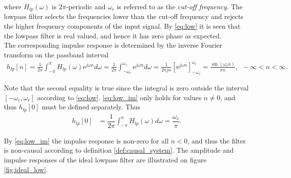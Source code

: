 where $H_{lp}(\omega)$ is $2\pi$-periodic and $\omega_c$ is referred to as the \textit{cut-off frequency}. The lowpass filter selects the frequencies lower than the cut-off frequency and rejects the higher frequency components of the input signal. By \eqref{eq:low} it is seen that the lowpass filter is real valued, and hence it has zero phase as expected. \\
The corresponding impulse response is determined by the inverse Fourier transform on the passband interval
\begin{align} \label{eq:low_im}
h_{lp}[n] = \frac{1}{2\pi} \int_{-\pi}^{\pi} H_{lp}(\omega) \text{e}^{j\omega n} d\omega =\frac{1}{2\pi}\int_{-\omega_c}^{\omega_c}\text{e}^{j\omega n} d\omega = \frac{1}{2\pi j n}\left[\text{e}^{j\omega n} \right]_{-\omega_c}^{\omega_c} = \frac{\sin(\omega_c n)}{\pi n}, \ \  -\infty < n < \infty.
\end{align}

Note that the second equality is true since the integral is zero outside the interval $[-\omega_c, \omega_c]$ according to \eqref{eq:low}. \eqref{eq:low_im} only holds for values $n \neq 0$, and thus $h_{lp}[0]$ must be defined separately. Thus
\begin{align*}
h_{lp}[0] &= \dfrac{1}{2\pi} \int_{-\pi}^\pi H_{lp}(\omega) d\omega = \dfrac{\omega_c}{\pi}.
\end{align*}

By \eqref{eq:low_im} the impulse response is non-zero for all $n<0$, and thus the filter is non-causal according to definition \ref{def:causal_system}.
The amplitude and impulse responses of the ideal lowpass filter are illustrated on figure \ref{fig:ideal_low}.

